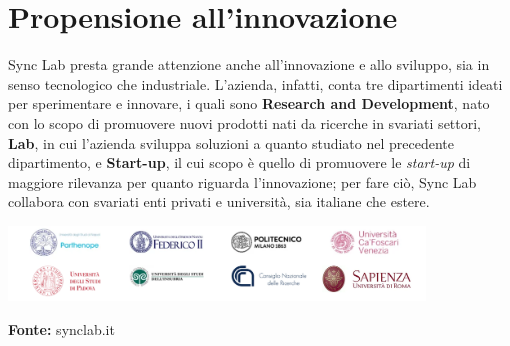 
\section{Propensione all'innovazione}

Sync Lab presta grande attenzione anche all'innovazione e allo sviluppo, sia in senso tecnologico che industriale. L'azienda, infatti, conta tre dipartimenti ideati per sperimentare e innovare, i quali sono \textbf{Research and Development}, nato con lo scopo di promuovere nuovi prodotti nati da ricerche in svariati settori, \textbf{Lab}, in cui l'azienda sviluppa soluzioni a quanto studiato nel precedente dipartimento, e \textbf{Start-up}, il cui scopo è quello di promuovere le \textit{start-up} di maggiore rilevanza per quanto riguarda l'innovazione; per fare ciò, Sync Lab collabora con svariati enti privati e università, sia italiane che estere.

\begin{minipage}{\linewidth}
  \centering
    \includegraphics[height=2cm]{immagini/universita}
  \caption*{\textbf{Fonte:} synclab.it}
\end{minipage} \\

